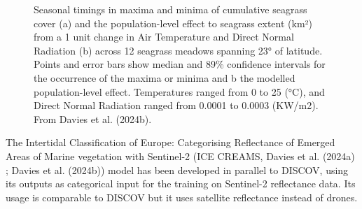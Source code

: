 \documentclass[
  letterpaper,
  11pt,
  english,
  singlespacing,
  headsepline]{MastersDoctoralThesis}
\begin{document}
\begin{spacing}{1.5}
\begin{figure}


\caption{\label{fig-PhenologyBede}Seasonal timings in maxima and minima
of cumulative seagrass cover (a) and the population-level effect to
seagrass extent (km²) from a 1 unit change in Air Temperature and Direct
Normal Radiation (b) across 12 seagrass meadows spanning 23° of
latitude. Points and error bars show median and 89\% confidence
intervals for the occurrence of the maxima or minima and b the modelled
population-level effect. Temperatures ranged from 0 to 25 (°C), and
Direct Normal Radiation ranged from 0.0001 to 0.0003 (KW/m2). From
Davies et al. (2024b).}

\end{figure}%

The Intertidal Classification of Europe: Categorising Reflectance of
Emerged Areas of Marine vegetation with Sentinel-2 (ICE CREAMS, Davies
et al. (2024a) ; Davies et al. (2024b)) model has been developed in
parallel to DISCOV, using its outputs as categorical input for the
training on Sentinel-2 reflectance data. Its usage is comparable to
DISCOV but it uses satellite reflectance instead of drones.

\begin{figure}

\centering{

}
\end{figure}
\end{spacing}
\end{document}
